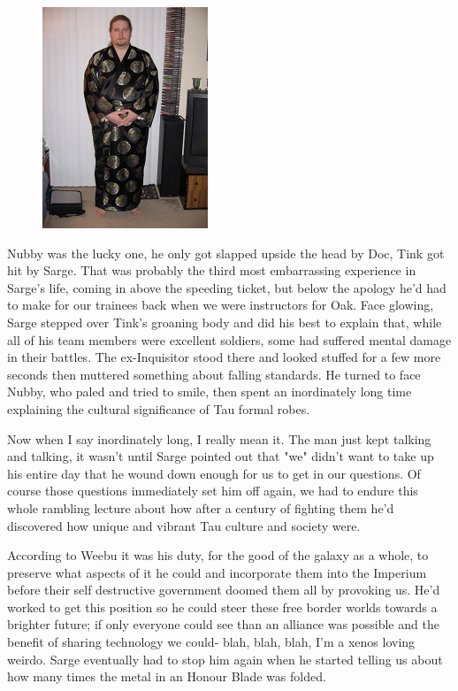 \begin{figure}
	\begin{center}
		\includegraphics[width=\figwidth]{pics/10/16.png}
	\end{center}
\end{figure}
Nubby was the lucky one, he only got slapped upside the head by Doc, Tink got hit by Sarge. 
That was probably the third most embarrassing experience in Sarge's life, coming in above the speeding ticket, but below the apology he'd had to make for our trainees back when we were instructors for Oak. 
Face glowing, Sarge stepped over Tink's groaning body and did his best to explain that, while all of his team members were excellent soldiers, some had suffered mental damage in their battles. 
The ex-Inquisitor stood there and looked stuffed for a few more seconds then muttered something about falling standards. 
He turned to face Nubby, who paled and tried to smile, then spent an inordinately long time explaining the cultural significance of Tau formal robes.

Now when I say inordinately long, I really mean it. 
The man just kept talking and talking, it wasn't until Sarge pointed out that "we" didn't want to take up his entire day that he wound down enough for us to get in our questions. 
Of course those questions immediately set him off again, we had to endure this whole rambling lecture about how after a century of fighting them he'd discovered how unique and vibrant Tau culture and society were. 


According to Weebu it was his duty, for the good of the galaxy as a whole, to preserve what aspects of it he could and incorporate them into the Imperium before their self destructive government doomed them all by provoking us. 
He'd worked to get this position so he could steer these free border worlds towards a brighter future; 
if only everyone could see than an alliance was possible and the benefit of sharing technology we could- blah, blah, blah, I'm a xenos loving weirdo. 
Sarge eventually had to stop him again when he started telling us about how many times the metal in an Honour Blade was folded.

